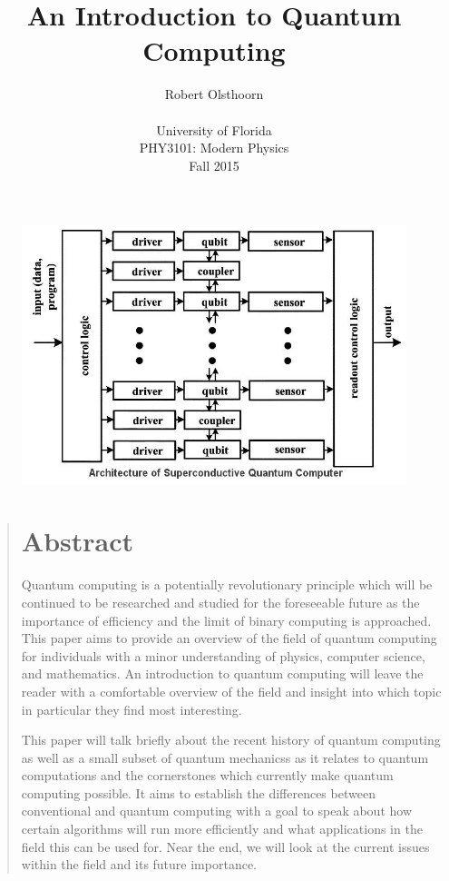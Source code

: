 \documentclass[12pt]{article}
\title{An Introduction to Quantum Computing}
\author
{Robert Olsthoorn\\
\\
\normalsize{University of Florida}\\
\normalsize{PHY3101: Modern Physics}\\
\normalsize{Fall 2015}\\
}
\date{}
\newenvironment{sciabstract}{%
\begin{quote} \bf}
{\end{quote}}
\begin{document}
 




\baselineskip24pt


\begin{figure}
\includegraphics[scale=.5]{superconductive}
\centering
\end{figure}

\maketitle 


\newpage

\begin{sciabstract}
\section*{Abstract}
Quantum computing is a potentially revolutionary principle which will be continued to be researched and studied for the foreseeable future as the importance of efficiency and the limit of binary computing is approached. This paper aims to provide an overview of the field of quantum computing for individuals with a minor understanding of physics, computer science, and mathematics. An introduction to quantum computing will leave the reader with a comfortable overview of the field and insight into which topic in particular they find most interesting.\par
This paper will talk briefly about the recent history of quantum computing as well as a small subset of quantum mechanicss as it relates to quantum computations and the cornerstones which currently make quantum computing possible. It aims to establish the differences between conventional and quantum computing with a goal to speak about how certain algorithms will run more efficiently and what applications in the field this can be used for. Near the end, we will look at the current issues within the field and its future importance.

\end{sciabstract}
\end{document}
